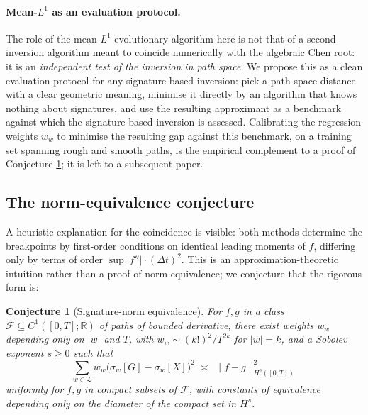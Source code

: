 \documentclass[11pt,english]{article}
\newtheorem{conjecture}[theorem]{Conjecture}
\begin{document}
\paragraph{Mean-$L^{1}$ as an evaluation protocol.}
The role of the mean-$L^{1}$ evolutionary algorithm here is not that
of a second inversion algorithm meant to coincide numerically with
the algebraic Chen root: it is an \emph{independent test of the
inversion in path space}. We propose this as a clean evaluation protocol
for any signature-based inversion: pick a path-space distance with a
clear geometric meaning, minimise it directly by an algorithm that
knows nothing about signatures, and use the resulting approximant as
a benchmark against which the signature-based inversion is assessed.
Calibrating the regression weights $w_{w}$ to minimise the resulting
gap against this benchmark, on a training set spanning rough and
smooth paths, is the empirical complement to a proof of Conjecture
\ref{conj:norm-equivalence}; it is left to a subsequent paper.

\subsection{The norm-equivalence conjecture}

A heuristic explanation for the coincidence is visible: both methods
determine the breakpoints by first-order conditions on identical leading
moments of $f$, differing only by terms of order $\sup|f''|\cdot(\Delta t)^{2}$.
This is an approximation-theoretic intuition rather than a proof of
norm equivalence; we conjecture that the rigorous form is:

\begin{conjecture}[Signature-norm equivalence]
\label{conj:norm-equivalence} For $f,g$ in a class $\mathcal{F}\subseteq C^{1}([0,T];\mathbb{R})$
of paths of bounded derivative, there exist weights $w_{w}$ depending
only on $|w|$ and $T$, with $w_{w}\sim(k!)^{2}/T^{2k}$ for $|w|=k$,
and a Sobolev exponent $s\geq0$ such that
\[
\sum_{w\in\mathcal{L}}w_{w}\bigl(\sigma_{w}[G]-\sigma_{w}[X]\bigr)^{2}\;\asymp\;\|f-g\|_{H^{s}([0,T])}^{2}
\]
uniformly for $f,g$ in compact subsets of $\mathcal{F}$, with constants
of equivalence depending only on the diameter of the compact set in
$H^{s}$.
\end{conjecture}
\end{document}
